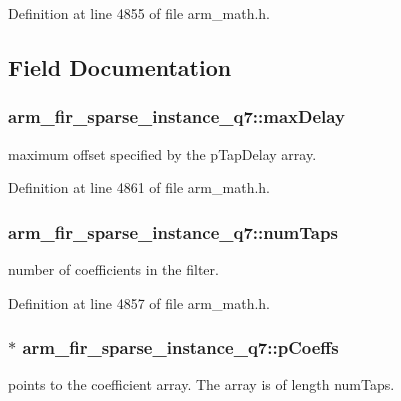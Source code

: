 Definition at line 4855 of file arm\-\_\-math.\-h.



\subsection{Field Documentation}
\hypertarget{structarm__fir__sparse__instance__q7_af74dacc1d34c078283e50f2530eb91df}{
\subsubsection[{max\-Delay}]{ arm\-\_\-fir\-\_\-sparse\-\_\-instance\-\_\-q7\-::max\-Delay}}\label{structarm__fir__sparse__instance__q7_af74dacc1d34c078283e50f2530eb91df}
maximum offset specified by the p\-Tap\-Delay array. 

Definition at line 4861 of file arm\-\_\-math.\-h.

\hypertarget{structarm__fir__sparse__instance__q7_a54cdd27ca1c672b126c38763ce678b1c}{
\subsubsection[{num\-Taps}]{ arm\-\_\-fir\-\_\-sparse\-\_\-instance\-\_\-q7\-::num\-Taps}}\label{structarm__fir__sparse__instance__q7_a54cdd27ca1c672b126c38763ce678b1c}
number of coefficients in the filter. 

Definition at line 4857 of file arm\-\_\-math.\-h.

\hypertarget{structarm__fir__sparse__instance__q7_a3dac86f15e33553e8f3e19e0d712bae5}{
\subsubsection[{p\-Coeffs}]{$\ast$ arm\-\_\-fir\-\_\-sparse\-\_\-instance\-\_\-q7\-::p\-Coeffs}}\label{structarm__fir__sparse__instance__q7_a3dac86f15e33553e8f3e19e0d712bae5}
points to the coefficient array. The array is of length num\-Taps. 

